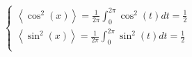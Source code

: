 \documentclass{article}
\begin{document}
\begin{adjustwidth}{-3cm}{-3cm}
    $\begin{cases}
        \displaystyle \left\langle \cos^2(x) \right\rangle = \frac{1}{2\pi}\int_{0}^{2\pi} \cos^2(t) dt = \frac{1}{2}\\
        \displaystyle \left\langle \sin^2(x) \right\rangle = \frac{1}{2\pi}\int_{0}^{2\pi} \sin^2(t) dt = \frac{1}{2} \\
    \end{cases}$
    

\end{adjustwidth}
\end{document}
